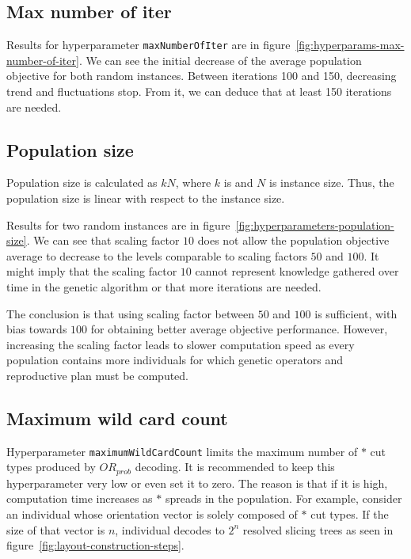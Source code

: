 \subsection{Max number of iter}\label{subsec:max-number-of-iter}
Results for hyperparameter \verb|maxNumberOfIter| are in figure~\ref{fig:hyperparams-max-number-of-iter}.
We can see the initial decrease of the average population objective for both random instances.
Between iterations 100 and 150, decreasing trend and fluctuations stop.
From it, we can deduce that at least 150 iterations are needed.

\subsection{Population size}\label{subsec:population-size}

Population size is calculated as $kN$, where $k$ is 
and $N$ is instance size.
Thus, the population size is linear with respect to the instance size.

Results for two random instances are in figure~\ref{fig:hyperparameters-population-size}.
We can see that scaling factor $10$ does not allow
the population objective average to decrease to the levels comparable to scaling factors $50$ and $100$.
It might imply that the scaling factor $10$ cannot represent knowledge gathered over time
in the genetic algorithm or that more iterations are needed.

The conclusion is that using scaling factor between $50$ and $100$ is sufficient, with bias towards $100$
for obtaining better average objective performance.
However, increasing the scaling factor leads to slower computation speed as every population contains
more individuals for which genetic operators and reproductive plan must be computed.

\subsection{Maximum wild card count}\label{subsec:maximum-wild-card-count}
Hyperparameter \verb|maximumWildCardCount| limits the maximum number of $*$ cut types produced by $OR_{prob}$ decoding.
It is recommended to keep this hyperparameter very low or even set it to zero.
The reason is that if it is high, computation time increases as $*$ spreads in the population.
For example, consider an individual whose orientation vector is solely composed of $*$ cut types.
If the size of that vector is $n$, individual decodes to $2^n$ resolved slicing trees as seen in figure~\ref{fig:layout-construction-steps}.

